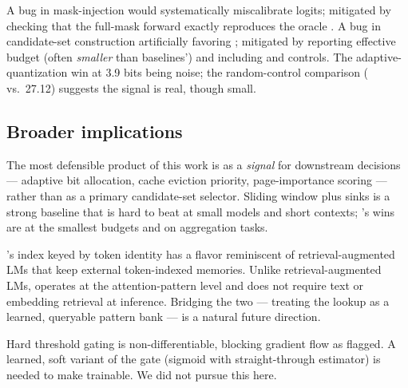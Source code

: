  A bug in mask-injection would systematically miscalibrate logits; mitigated by checking that the full-mask forward exactly reproduces the oracle \ppl. A bug in \hma candidate-set construction artificially favoring \hma; mitigated by reporting effective budget (often \emph{smaller} than baselines') and including \randomb and \hto controls. The adaptive-quantization win at 3.9 bits being noise; the random-control comparison ( vs.\ 27.12) suggests the signal is real, though small.

\subsection{Broader implications}

 The most defensible product of this work is \hma as a \emph{signal} for downstream decisions --- adaptive bit allocation, cache eviction priority, page-importance scoring --- rather than as a primary candidate-set selector. Sliding window plus sinks is a strong baseline that is hard to beat at small models and short contexts; \hma's wins are at the smallest budgets and on aggregation tasks.

 \hma's index keyed by token identity has a flavor reminiscent of retrieval-augmented LMs that keep external token-indexed memories. Unlike retrieval-augmented LMs, \hma operates at the attention-pattern level and does not require text or embedding retrieval at inference. Bridging the two --- treating the lookup as a learned, queryable pattern bank --- is a natural future direction.

 Hard threshold gating is non-differentiable, blocking gradient flow as \nsa \citep{deepseek2025nsa} flagged. A learned, soft variant of the gate (\eg sigmoid with straight-through estimator) is needed to make \hma trainable. We did not pursue this here.
